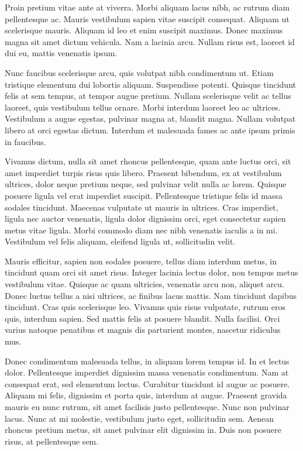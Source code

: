 \documentclass[a4paper,twoside,notitlepage,openright,11pt]{report}
\begin{document}
Proin pretium vitae ante at viverra. Morbi aliquam lacus nibh, ac rutrum diam pellentesque ac. Mauris vestibulum sapien vitae suscipit consequat. Aliquam ut scelerisque mauris. Aliquam id leo et enim suscipit maximus. Donec maximus magna sit amet dictum vehicula. Nam a lacinia arcu. Nullam risus est, laoreet id dui eu, mattis venenatis ipsum.

Nunc faucibus scelerisque arcu, quis volutpat nibh condimentum ut. Etiam tristique elementum dui lobortis aliquam. Suspendisse potenti. Quisque tincidunt felis at sem tempus, at tempor augue pretium. Nullam scelerisque velit ac tellus laoreet, quis vestibulum tellus ornare. Morbi interdum laoreet leo ac ultrices. Vestibulum a augue egestas, pulvinar magna at, blandit magna. Nullam volutpat libero at orci egestas dictum. Interdum et malesuada fames ac ante ipsum primis in faucibus.

Vivamus dictum, nulla sit amet rhoncus pellentesque, quam ante luctus orci, sit amet imperdiet turpis risus quis libero. Praesent bibendum, ex at vestibulum ultrices, dolor neque pretium neque, sed pulvinar velit nulla ac lorem. Quisque posuere ligula vel erat imperdiet suscipit. Pellentesque tristique felis id massa sodales tincidunt. Maecenas vulputate ut mauris in ultrices. Cras imperdiet, ligula nec auctor venenatis, ligula dolor dignissim orci, eget consectetur sapien metus vitae ligula. Morbi commodo diam nec nibh venenatis iaculis a in mi. Vestibulum vel felis aliquam, eleifend ligula ut, sollicitudin velit.

Mauris efficitur, sapien non sodales posuere, tellus diam interdum metus, in tincidunt quam orci sit amet risus. Integer lacinia lectus dolor, non tempus metus vestibulum vitae. Quisque ac quam ultricies, venenatis arcu non, aliquet arcu. Donec luctus tellus a nisi ultrices, ac finibus lacus mattis. Nam tincidunt dapibus tincidunt. Cras quis scelerisque leo. Vivamus quis risus vulputate, rutrum eros quis, interdum sapien. Sed mattis felis at posuere blandit. Nulla facilisi. Orci varius natoque penatibus et magnis dis parturient montes, nascetur ridiculus mus.

Donec condimentum malesuada tellus, in aliquam lorem tempus id. In et lectus dolor. Pellentesque imperdiet dignissim massa venenatis condimentum. Nam at consequat erat, sed elementum lectus. Curabitur tincidunt id augue ac posuere. Aliquam mi felis, dignissim et porta quis, interdum at augue. Praesent gravida mauris eu nunc rutrum, sit amet facilisis justo pellentesque. Nunc non pulvinar lacus. Nunc at mi molestie, vestibulum justo eget, sollicitudin sem. Aenean rhoncus pretium metus, sit amet pulvinar elit dignissim in. Duis non posuere risus, at pellentesque sem.
\end{document}
